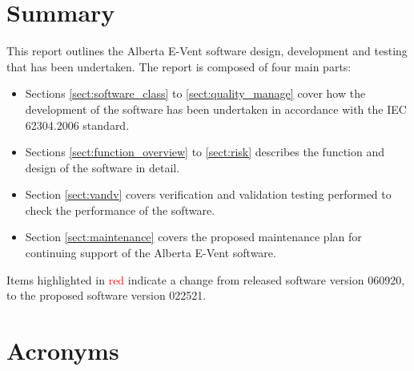 \documentclass[]{article}
\begin{document}
\clearpage

\tableofcontents

\clearpage


\section{Summary}

This report outlines the Alberta E-Vent software design, development and testing that has been undertaken.  The report is composed of four main parts:
\begin{itemize}
	\item Sections \ref{sect:software_class} to \ref{sect:quality_manage} cover how the development of the software has been undertaken in accordance with the IEC 62304.2006 standard.
	\item Sections \ref{sect:function_overview} to \ref{sect:risk} describes the function and design of the software in detail.
	\item Section \ref{sect:vandv} covers verification and validation testing performed to check the performance of the software.
	\item Section \ref{sect:maintenance} covers the proposed maintenance plan for continuing support of the Alberta E-Vent software.
\end{itemize}
Items highlighted in \textcolor{red}{red} indicate a change from released software version 060920, to the proposed software version 022521.

\clearpage

\section{Acronyms}

\begin{acronym}
	
	
	
	
	
	
	
	
\end{acronym}
\end{document}
